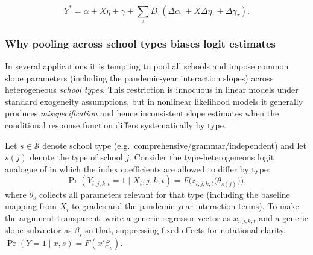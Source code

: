 \documentclass[12pt]{article}
\begin{document}
\begin{equation}
\label{eq:main}
Y^* = \alpha + X\eta + \gamma + \sum_{\tau} D_\tau(\Delta\alpha_\tau + X\Delta\eta_\tau + \Delta\gamma_\tau).
\end{equation}

\subsubsection{Why pooling across school types biases logit estimates}
\label{sec:pooling_schooltype_bias}
In several applications it is tempting to pool all schools and impose common slope parameters (including the pandemic-year interaction slopes) across heterogeneous \emph{school types}. This restriction is innocuous in linear models under standard exogeneity assumptions, but in nonlinear likelihood models it generally produces \emph{misspecification} and hence inconsistent slope estimates when the conditional response function differs systematically by type.

Let $s\in\mathcal{S}$ denote school type (e.g.\ comprehensive/grammar/independent) and let $s(j)$ denote the type of school $j$. Consider the type-heterogeneous logit analogue of  in which the index coefficients are allowed to differ by type:
\begin{equation}
\label{eq:main_type}
\Pr\!\left(Y_{i,j,k,t}=1 \mid X_i, j, k, t\right)
=
F\!\Big(z_{i,j,k,t}\big(\theta_{s(j)}\big)\Big),
\end{equation}
where $\theta_{s}$ collects all parameters relevant for that type (including the baseline mapping from $X_i$ to grades and the pandemic-year interaction terms). To make the argument transparent, write a generic regressor vector as $x_{i,j,k,t}$ and a generic slope subvector as $\beta_s$ so that, suppressing fixed effects for notational clarity,
\(
\Pr(Y=1\mid x,s)=F(x'\beta_s).
\)
\end{document}

